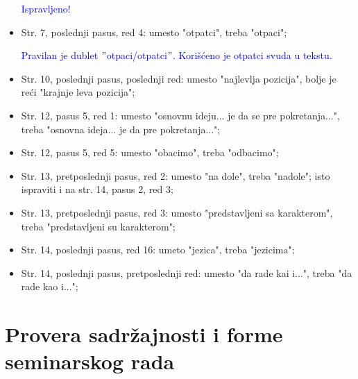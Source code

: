\documentclass[a4paper]{report}
\newcommand{\odgovor}[1]{\textcolor{blue}{#1}}
\begin{document}
\begin{itemize}
	
	\odgovor{Ispravljeno!}
	
	\item Str. 7, poslednji pasus, red 4: umesto "otpatci", treba "otpaci";
	
	\odgovor{Pravilan je dublet $"$otpaci/otpatci$"$. Korišćeno je otpatci svuda u tekstu.}
	
	\item Str. 10, poslednji pasus, poslednji red: umesto "najlevlja pozicija", bolje je reći "krajnje leva pozicija";
	\item Str. 12, pasus 5, red 1: umesto "osnovnu ideju... je da se pre pokretanja...", treba "osnovna ideja... je da pre pokretanja...";
	\item Str. 12, pasus 5, red 5: umesto "obacimo", treba "odbacimo";
	\item Str. 13, pretposlednji pasus, red 2: umesto "na dole", treba "nadole"; isto ispraviti i na str. 14, pasus 2, red 3;
	\item Str. 13, pretposlednji pasus, red 3: umesto "predstavljeni sa karakterom", treba "predstavljeni su karakterom";
	\item Str. 14, poslednji pasus, red 16: umeto "jezica", treba "jezicima";
	\item Str. 14, poslednji pasus, pretposlednji red: umesto "da rade kai i...", treba "da rade kao i...";      
\end{itemize}
\section{Provera sadržajnosti i forme seminarskog rada}
\end{document}

